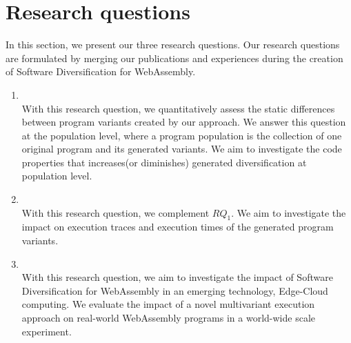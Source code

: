 
\section{Research questions}
\label{intro:definition:rq}

In this section, we present our three research questions. Our research questions are formulated by merging our publications and experiences during the creation of Software Diversification for WebAssembly. 

\begin{enumerate}[label=\subscript{RQ}{{\arabic*}}]
    \item \textbf{\rqone}\\
    With this research question, we quantitatively assess the static differences between program variants created by our approach. We answer this question at the population level, where a program population is the collection of one original program and its generated variants. We aim to investigate the code properties that increases(or diminishes) generated diversification at population level. 

    \item \textbf{\rqtwo} \\
    With this research question, we complement $RQ_1$. We aim to investigate the impact on execution traces and execution times of the generated program variants.

    \item \textbf{\rqthree} \\
    With this research question, we aim to investigate the impact of Software Diversification for WebAssembly in an emerging technology, Edge-Cloud computing. We evaluate the impact of a novel multivariant execution approach on real-world WebAssembly programs in a world-wide scale experiment.
    
    
\end{enumerate}


\renewcommand{\rqone}{$RQ_1$. To what extent can we artifically generate program variants for WebAssembly?}

\renewcommand{\rqtwo}{$RQ_2$. To what extent are the generated variants dynamically different?}
\renewcommand{\rqthree}{$RQ_3$. To what extent do the artificial variants exhibit different execution times on Edge-Cloud platforms?}

